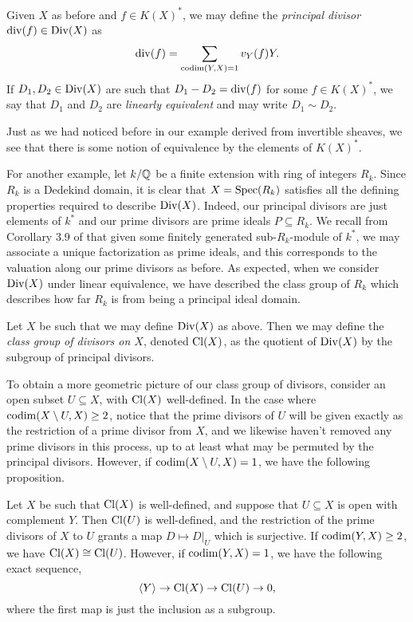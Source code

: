 \begin{definition}
    Given $X$ as before and $f \in K(X)^*$,
    we may define the \textit{principal divisor} ${\rm div}(f) \in {\rm Div}(X)$ as
    \[
        {\rm div}(f) = \sum_{{\rm codim}(Y, X) = 1} v_Y(f) Y.
    \]
    If $D_1, D_2 \in {\rm Div}(X)$ are such that $D_1 - D_2 = {\rm div}(f)$ for some $f \in K(X)^*$,
    we say that $D_1$ and $D_2$ are \textit{linearly equivalent} and may write $D_1 \sim D_2$.
\end{definition}

Just as we had noticed before in our example derived from invertible sheaves,
we see that there is some notion of equivalence by the elements of $K(X)^*$.

For another example, let $k/\mathbb{Q}$ be a finite extension with ring of integers $R_k$.
Since $R_k$ is a Dedekind domain, it is clear that $X = {\rm Spec}(R_k)$ satisfies all the defining properties required to describe ${\rm Div}(X)$.
Indeed, our principal divisors are just elements of $k^*$ and our prime divisors are prime ideals $P \subseteq R_k$.
We recall from Corollary 3.9 of \cite{Neukirch_2013} that given some finitely generated sub-$R_k$-module of $k^*$,
we may associate a unique factorization as prime ideals,
and this corresponds to the valuation along our prime divisors as before.
As expected, when we consider ${\rm Div}(X)$ under linear equivalence,
we have described the class group of $R_k$ which describes how far $R_k$ is from being a principal ideal domain.

\begin{definition}
    Let $X$ be such that we may define ${\rm Div}(X)$ as above.
    Then we may define the \textit{class group of divisors on $X$},
    denoted ${\rm Cl}(X)$,
    as the quotient of ${\rm Div}(X)$ by the subgroup of principal divisors.
\end{definition}

To obtain a more geometric picture of our class group of divisors,
consider an open subset $U \subseteq X$, with ${\rm Cl}(X)$ well-defined.
In the case where ${\rm codim}(X \setminus U, X) \geq 2$,
notice that the prime divisors of $U$ will be given exactly as the restriction of a prime divisor from $X$,
and we likewise haven't removed any prime divisors in this process,
up to at least what may be permuted by the principal divisors.
However, if ${\rm codim}(X \setminus U, X) = 1$, we have the following proposition.

\begin{proposition}
    Let $X$ be such that ${\rm Cl}(X)$ is well-defined,
    and suppose that $U \subseteq X$ is open with complement $Y$.
    Then ${\rm Cl}(U)$ is well-defined,
    and the restriction of the prime divisors of $X$ to $U$ grants a map $D \mapsto D|_U$ which is surjective.
    If ${\rm codim}(Y, X) \geq 2$, we have ${\rm Cl}(X) \cong {\rm Cl}(U)$.
    However, if ${\rm codim}(Y, X) = 1$, we have the following exact sequence,
    \[
        \langle Y \rangle \to {\rm Cl}(X) \to {\rm Cl}(U) \to 0,
    \]
    where the first map is just the inclusion as a subgroup. 
\end{proposition}

